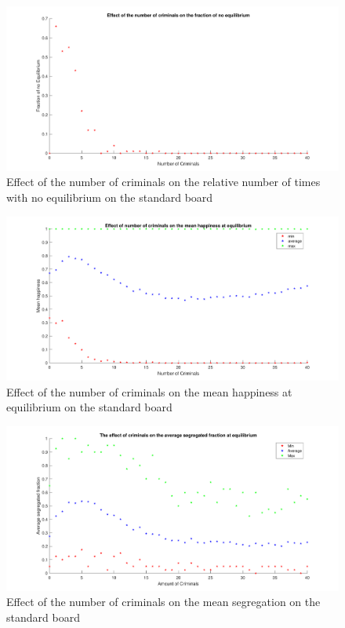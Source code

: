 \begin{figure}[H]
	\centering
    \includegraphics[width=\textwidth]{aantcrim-fracnoeq.pdf}
    \caption{Effect of the number of criminals on the relative number of times with no equilibrium on the standard board}
    \label{fig:cr-noeq}
\end{figure}

\begin{figure}[H]
	\centering
    \includegraphics[width=\textwidth]{aantcrim-gemeindhappiness.pdf}
    \caption{Effect of the number of criminals on the mean happiness at equilibrium on the standard board}
    \label{fig:cr-happ}
\end{figure}

\begin{figure}[H]
	\centering
    \includegraphics[width=\textwidth]{aantcrim-segreind.pdf}
    \caption{Effect of the number of criminals on the mean segregation on the standard board}
    \label{fig:cr-segr}
\end{figure}

